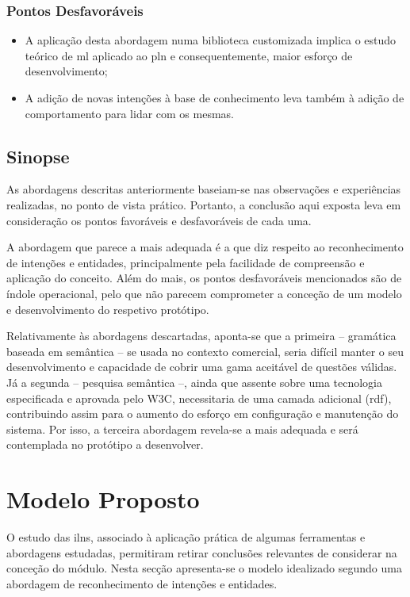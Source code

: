 \subsubsection*{Pontos Desfavoráveis}
\begin{itemize}
    \item
    {
        A aplicação desta abordagem numa biblioteca customizada implica o estudo teórico de \gls{ml} aplicado ao \gls{pln} e consequentemente, maior esforço de desenvolvimento;
    }
    \item
    {
        A adição de novas intenções à base de conhecimento leva também à adição de comportamento para lidar com os mesmas.
    }
\end{itemize}

\subsection{Sinopse}
As abordagens descritas anteriormente baseiam-se nas observações e experiências realizadas, no ponto de vista prático. Portanto, a conclusão aqui exposta leva em consideração os pontos favoráveis e desfavoráveis de cada uma.

A abordagem que parece a mais adequada é a que diz respeito ao reconhecimento de intenções e entidades, principalmente pela facilidade de compreensão e aplicação do conceito. Além do mais, os pontos desfavoráveis mencionados são de índole operacional, pelo que não parecem comprometer a conceção de um modelo e desenvolvimento do respetivo protótipo. 

Relativamente às abordagens descartadas, aponta-se que a primeira -- gramática baseada em semântica -- se usada no contexto comercial, seria difícil manter o seu desenvolvimento e capacidade de cobrir uma gama aceitável de questões válidas. Já a segunda -- pesquisa semântica --, ainda que assente sobre uma tecnologia especificada e aprovada pelo W3C, necessitaria de uma camada adicional (\gls{rdf}), contribuindo assim para o aumento do esforço em configuração e manutenção do sistema. Por isso, a terceira abordagem revela-se a mais adequada e será contemplada no protótipo a desenvolver.

\section{Modelo Proposto}
\label{sec:chap04_proposal}
O estudo das \glspl{iln}, associado à aplicação prática de algumas ferramentas e abordagens estudadas, permitiram retirar conclusões relevantes de considerar na conceção do módulo. Nesta secção apresenta-se o modelo idealizado segundo uma abordagem de reconhecimento de intenções e entidades.

